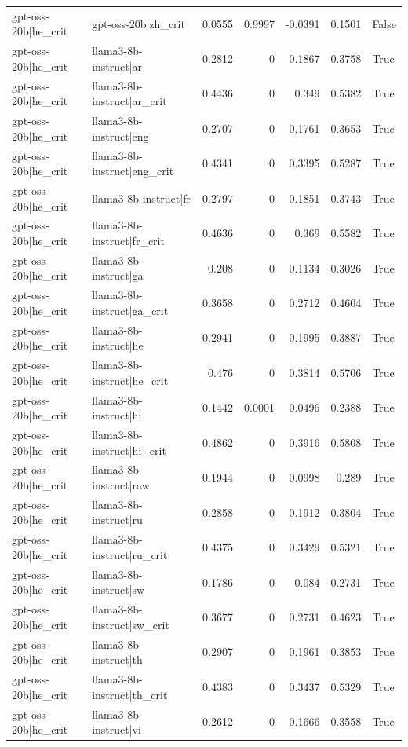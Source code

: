 \begin{table}
\begin{tabular}{l l r r r r l}
gpt-oss-20b|he_crit & gpt-oss-20b|zh_crit & 0.0555 & 0.9997 & -0.0391 & 0.1501 & False \\
gpt-oss-20b|he_crit & llama3-8b-instruct|ar & 0.2812 & 0 & 0.1867 & 0.3758 & True \\
gpt-oss-20b|he_crit & llama3-8b-instruct|ar_crit & 0.4436 & 0 & 0.349 & 0.5382 & True \\
gpt-oss-20b|he_crit & llama3-8b-instruct|eng & 0.2707 & 0 & 0.1761 & 0.3653 & True \\
gpt-oss-20b|he_crit & llama3-8b-instruct|eng_crit & 0.4341 & 0 & 0.3395 & 0.5287 & True \\
gpt-oss-20b|he_crit & llama3-8b-instruct|fr & 0.2797 & 0 & 0.1851 & 0.3743 & True \\
gpt-oss-20b|he_crit & llama3-8b-instruct|fr_crit & 0.4636 & 0 & 0.369 & 0.5582 & True \\
gpt-oss-20b|he_crit & llama3-8b-instruct|ga & 0.208 & 0 & 0.1134 & 0.3026 & True \\
gpt-oss-20b|he_crit & llama3-8b-instruct|ga_crit & 0.3658 & 0 & 0.2712 & 0.4604 & True \\
gpt-oss-20b|he_crit & llama3-8b-instruct|he & 0.2941 & 0 & 0.1995 & 0.3887 & True \\
gpt-oss-20b|he_crit & llama3-8b-instruct|he_crit & 0.476 & 0 & 0.3814 & 0.5706 & True \\
gpt-oss-20b|he_crit & llama3-8b-instruct|hi & 0.1442 & 0.0001 & 0.0496 & 0.2388 & True \\
gpt-oss-20b|he_crit & llama3-8b-instruct|hi_crit & 0.4862 & 0 & 0.3916 & 0.5808 & True \\
gpt-oss-20b|he_crit & llama3-8b-instruct|raw & 0.1944 & 0 & 0.0998 & 0.289 & True \\
gpt-oss-20b|he_crit & llama3-8b-instruct|ru & 0.2858 & 0 & 0.1912 & 0.3804 & True \\
gpt-oss-20b|he_crit & llama3-8b-instruct|ru_crit & 0.4375 & 0 & 0.3429 & 0.5321 & True \\
gpt-oss-20b|he_crit & llama3-8b-instruct|sw & 0.1786 & 0 & 0.084 & 0.2731 & True \\
gpt-oss-20b|he_crit & llama3-8b-instruct|sw_crit & 0.3677 & 0 & 0.2731 & 0.4623 & True \\
gpt-oss-20b|he_crit & llama3-8b-instruct|th & 0.2907 & 0 & 0.1961 & 0.3853 & True \\
gpt-oss-20b|he_crit & llama3-8b-instruct|th_crit & 0.4383 & 0 & 0.3437 & 0.5329 & True \\
gpt-oss-20b|he_crit & llama3-8b-instruct|vi & 0.2612 & 0 & 0.1666 & 0.3558 & True \\

\end{tabular}
\end{table}
